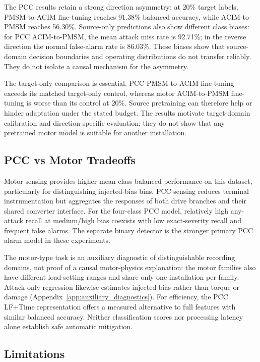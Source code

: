\documentclass[letterpaper,journal]{IEEEtran}
\begin{document}
The PCC results retain a strong direction asymmetry: at 20\% target labels, PMSM-to-ACIM fine-tuning reaches 91.38\% balanced accuracy, while ACIM-to-PMSM reaches 56.30\%. Source-only predictions also show different class biases: for PCC ACIM-to-PMSM, the mean attack miss rate is 92.71\%; in the reverse direction the normal false-alarm rate is 86.03\%. These biases show that source-domain decision boundaries and operating distributions do not transfer reliably. They do not isolate a causal mechanism for the asymmetry.

The target-only comparison is essential. PCC PMSM-to-ACIM fine-tuning exceeds its matched target-only control, whereas motor ACIM-to-PMSM fine-tuning is worse than its control at 20\%. Source pretraining can therefore help or hinder adaptation under the stated budget. The results motivate target-domain calibration and direction-specific evaluation; they do not show that any pretrained motor model is suitable for another installation.

\subsection{PCC vs Motor Tradeoffs}
\label{sec:pcc_vs_motor}

Motor sensing provides higher mean class-balanced performance on this dataset, particularly for distinguishing injected-bias bins. PCC sensing reduces terminal instrumentation but aggregates the responses of both drive branches and their shared converter interface. For the four-class PCC model, relatively high any-attack recall at medium/high bias coexists with low exact-severity recall and frequent false alarms. The separate binary detector is the stronger primary PCC alarm model in these experiments.

The motor-type task is an auxiliary diagnostic of distinguishable recording domains, not proof of a causal motor-physics explanation: the motor families also have different load-setting ranges and share only one installation per family. Attack-only regression likewise estimates injected bias rather than torque or damage (Appendix~\ref{app:auxiliary_diagnostics}). For efficiency, the PCC LF+Time representation offers a measured alternative to full features with similar balanced accuracy. Neither classification scores nor processing latency alone establish safe automatic mitigation.

\subsection{Limitations}
\label{sec:limitations}
\end{document}
